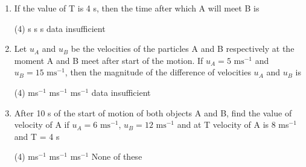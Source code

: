 \documentclass{article}
\begin{document}
\begin{enumerate}
    \item If the value of T is 4 s, then the time after which A will meet B is
        \begin{tasks}(4)
             s
             s
             s
            \task data insufficient
        \end{tasks}

    \item Let $u_A$ and $u_B$ be the velocities of the particles A and B respectively at the moment A and B meet after start of the motion. If $u_A = 5 \text{ ms}^{-1}$ and $u_B = 15 \text{ ms}^{-1}$, then the magnitude of the difference of velocities $u_A$ and $u_B$ is
        \begin{tasks}(4)
             ms\(^{-1}\)
             ms\(^{-1}\)
             ms\(^{-1}\)
            \task data insufficient
        \end{tasks}

    \item After 10 s of the start of motion of both objects A and B, find the value of velocity of A if $u_A = 6 \text{ ms}^{-1}$, $u_B = 12 \text{ ms}^{-1}$ and at T velocity of A is 8 ms\(^{-1}\) and T = 4 s
        \begin{tasks}(4)
             ms\(^{-1}\)
             ms\(^{-1}\)
             ms\(^{-1}\)
            \task None of these
        \end{tasks}
\end{enumerate}

\vspace*{10 mm}
\end{document}
